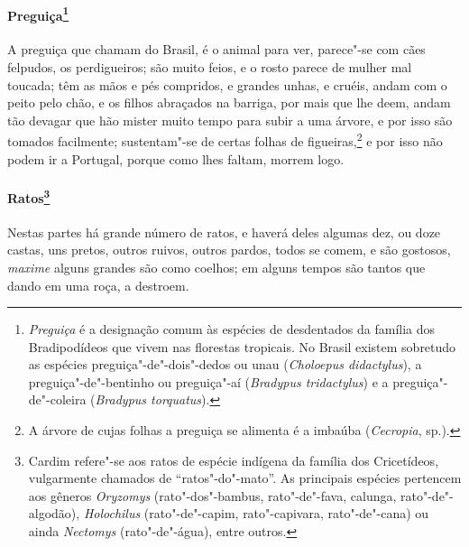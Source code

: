 \paragraph{Preguiça\footnote{ \textit{Preguiça} é a designação
comum às espécies de desdentados da família dos Bradipodídeos que vivem
nas florestas tropicais. No Brasil existem sobretudo as espécies
preguiça"-de"-dois"-dedos ou unau (\textit{Choloepus didactylus}), a
preguiça"-de"-bentinho ou preguiça"-aí (\textit{Bradypus tridactylus}) e a
preguiça"-de"-coleira (\textit{Bradypus torquatus}).}} A
preguiça que chamam do Brasil, é o animal para ver, parece"-se com cães
felpudos, os perdigueiros; são muito feios, e o rosto parece de mulher
mal toucada; têm as mãos e pés compridos, e grandes unhas, e cruéis,
andam com o peito pelo chão, e os filhos abraçados na barriga, por mais
que lhe deem, andam tão devagar que hão mister muito tempo para subir a
uma árvore, e por isso são tomados facilmente; sustentam"-se de certas
folhas de figueiras,\footnote{ A árvore de cujas folhas a preguiça
se alimenta é a imbaúba (\textit{Cecropia}, sp.).} e por isso não
podem ir a Portugal, porque como lhes faltam, morrem logo.

\paragraph{Ratos\footnote{ Cardim refere"-se aos ratos de espécie
indígena da família dos Cricetídeos, vulgarmente chamados de ``ratos"-do"-mato''. 
As principais espécies pertencem aos gêneros
\textit{Oryzomys} (rato"-dos"-bambus, rato"-de"-fava, calunga,
rato"-de"-algodão), \textit{Holochilus} (rato"-de"-capim, rato"-capivara,
rato"-de"-cana) ou ainda \textit{Nectomys} (rato"-de"-água), entre
outros.}} Nestas partes há grande número de ratos, e
haverá deles algumas dez, ou doze castas, uns pretos, outros ruivos,
outros pardos, todos se comem, e são gostosos, \textit{maxime} alguns
grandes são como coelhos; em alguns tempos são tantos que dando em uma
roça, a destroem. 

